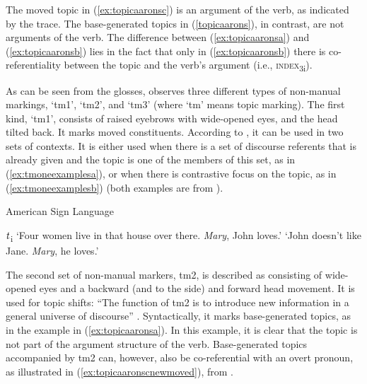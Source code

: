 \noindent The moved topic in (\ref{ex:topicaaronsc}) is an argument of the verb, as indicated by the trace. The base-generated topics in (\ref{topicaarons}), in contrast, are not arguments of the verb. The difference between (\ref{ex:topicaaronsa}) and (\ref{ex:topicaaronsb}) lies in the fact that only in (\ref{ex:topicaaronsb}) there is co-referentiality between the topic and the verb's argument (i.e., \textsc{index}\textsubscript{3i}).

As can be seen from the glosses, \citet{aarons1996topics} observes three different types of non-manual markings, `tm1', `tm2', and `tm3' (where `tm' means topic marking). The first kind, `tm1', consists of raised eyebrows with wide-opened eyes, and the head tilted back. It marks moved constituents. According to \citet{aarons1996topics}, it can be used in two sets of contexts. It is either used when there is a set of discourse referents that is already given and the topic is one of the members of this set, as in (\ref{ex:tmoneexamplesa}), or  when there is contrastive focus on the topic, as in (\ref{ex:tmoneexamplesb}) (both examples are from \citealt[76]{aarons1996topics}).

\begin{exe}
\ex American Sign Language \label{tmoneexamples}\begin{xlist}
\ex {}   $\textrm{\textit{t}}$\textsubscript{i}
\glt `Four women live in that house over there. \textit{Mary}, John loves.' \label{ex:tmoneexamplesa}
\ex {}  
\glt `John doesn't like Jane. \textit{Mary}, he loves.' \label{ex:tmoneexamplesb}
\end{xlist}
\end{exe}

\noindent The second set of non-manual markers, tm2, is described as consisting of wide-opened eyes and a backward (and to the side) and forward head movement. It is used for topic shifts: ``The function of tm2 is to introduce new information in a general universe of discourse'' \citep[79]{aarons1996topics}. Syntactically, it marks base-generated topics, as in the example in (\ref{ex:topicaaronsa}). In this example, it is clear that the topic is not part of the argument structure of the verb. Base-generated topics accompanied by tm2 can, however, also be co-referential with an overt pronoun, as illustrated in (\ref{ex:topicaaronscnewmoved}), from \citet[79]{aarons1996topics}.



